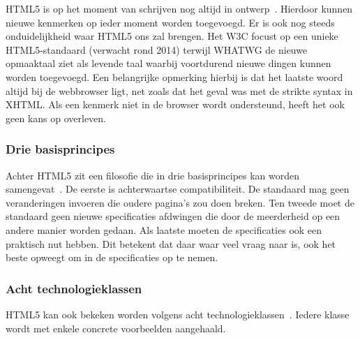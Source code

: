 HTML5 is op het moment van schrijven nog altijd in ontwerp~\cite{MacDonald2011}. 
Hierdoor kunnen nieuwe kenmerken op ieder moment worden toegevoegd.  
Er is ook nog steeds onduidelijkheid waar HTML5 ons zal brengen.  
Het W3C focust op een unieke HTML5-standaard (verwacht rond 2014) terwijl WHATWG de nieuwe opmaaktaal ziet als levende taal waarbij voortdurend  nieuwe dingen kunnen worden toegevoegd. 
Een belangrijke opmerking hierbij is dat het laatste woord altijd bij de webbrowser ligt, net zoals dat het geval was met de strikte syntax in XHTML. 
Als een kenmerk niet in de browser wordt ondersteund, heeft het ook geen kans op overleven.

\subsubsection{Drie basisprincipes}
Achter HTML5 zit een filosofie die in drie basisprincipes kan worden samengevat~\cite{MacDonald2011}.  
De eerste is achterwaartse compatibiliteit. 
De standaard mag geen veranderingen invoeren die oudere pagina's zou doen breken. 
Ten tweede moet de standaard geen nieuwe specificaties afdwingen die door de meerderheid op een andere manier worden gedaan. 
Als laatste moeten de specificaties ook een praktisch nut hebben. 
Dit betekent dat daar waar veel vraag naar is, ook het beste opweegt om in de specificaties op te nemen.

\subsubsection{Acht technologieklassen}
HTML5 kan ook bekeken worden volgens acht technologieklassen~\cite{W3C2012}. 
Iedere klasse wordt met enkele concrete voorbeelden aangehaald.

